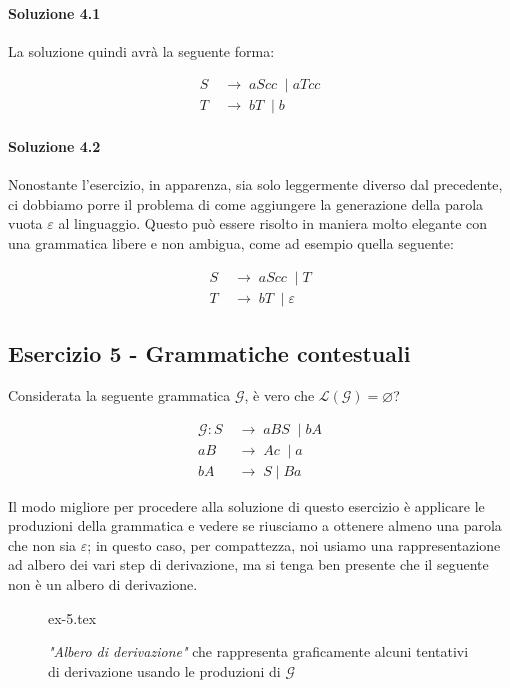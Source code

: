 \documentclass[class=book, crop=false, oneside, 12pt]{standalone}
\begin{document}
\paragraph{Soluzione 4.1}
La soluzione quindi avrà la seguente forma:

\begin{align*}
  S\; &\to\; aScc\; \mid  aTcc \\
  T\; &\to\; bT\; \mid b
\end{align*}

\paragraph{Soluzione 4.2}
Nonostante l'esercizio, in apparenza, sia solo leggermente diverso dal precedente, ci dobbiamo porre il problema di come aggiungere la generazione della parola vuota \(\varepsilon\) al linguaggio. Questo può essere risolto in maniera molto elegante con una grammatica libere e non ambigua, come ad esempio quella seguente:

\begin{align*}
  S\; &\to\; aScc\; \mid T \\
  T\; &\to\; bT\; \mid \varepsilon
\end{align*}

\subsection*{Esercizio 5 - Grammatiche contestuali}
Considerata la seguente grammatica \(\mathcal{G}\), è vero che \(\mathcal{L(G)} = \varnothing\)?

\begin{align*}
  \mathcal{G}: S\; &\to\; aBS\; \mid bA \\
  aB\; &\to\; Ac\; \mid a \\
  bA\; &\to\; S \mid Ba
\end{align*}

\noindent Il modo migliore per procedere alla soluzione di questo esercizio è applicare le produzioni della grammatica e vedere se riusciamo a ottenere almeno una parola che non sia \(\varepsilon\); in questo caso, per compattezza, noi usiamo una rappresentazione ad albero dei vari step di derivazione, ma si tenga ben presente che il seguente non è un albero di derivazione.

\begin{figure}[H]
	\centering
	{ex-5.tex}
	\caption{\emph{"Albero di derivazione"} che rappresenta graficamente alcuni tentativi di derivazione usando le produzioni di \(\mathcal{G}\)}
\end{figure}
\end{document}
